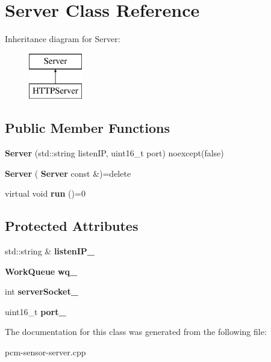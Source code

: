 \section{Server Class Reference}
\label{classServer}
Inheritance diagram for Server\+:\begin{figure}[H]
\begin{center}
\leavevmode
\includegraphics[height=2.000000cm]{classServer}
\end{center}
\end{figure}
\subsection*{Public Member Functions}
\begin{DoxyCompactItemize}
\item 
\mbox{\label{classServer_a5f2e98ca3513f04ddc0ba8f8ae0b5574}} 
{\bfseries Server} (std\+::string listen\+IP, uint16\+\_\+t port) noexcept(false)
\item 
\mbox{\label{classServer_ac0a402ca54125d9f8f97d191a5649965}} 
{\bfseries Server} (\textbf{ Server} const \&)=delete
\item 
\mbox{\label{classServer_a2aa16b19aac606e71575c65fc62d065e}} 
virtual void {\bfseries run} ()=0
\end{DoxyCompactItemize}
\subsection*{Protected Attributes}
\begin{DoxyCompactItemize}
\item 
\mbox{\label{classServer_a16dc2141f61bcdadfb91772466c24ab9}} 
std\+::string \& {\bfseries listen\+I\+P\+\_\+}
\item 
\mbox{\label{classServer_a441d95d5c60f664e3eda4793d74a0a61}} 
\textbf{ Work\+Queue} {\bfseries wq\+\_\+}
\item 
\mbox{\label{classServer_ad4c7a9776f5661e2e79136ac68089377}} 
int {\bfseries server\+Socket\+\_\+}
\item 
\mbox{\label{classServer_a2f7a5ce1a386e285bee442cc00828df9}} 
uint16\+\_\+t {\bfseries port\+\_\+}
\end{DoxyCompactItemize}


The documentation for this class was generated from the following file\+:\begin{DoxyCompactItemize}
\item 
pcm-\/sensor-\/server.\+cpp\end{DoxyCompactItemize}
